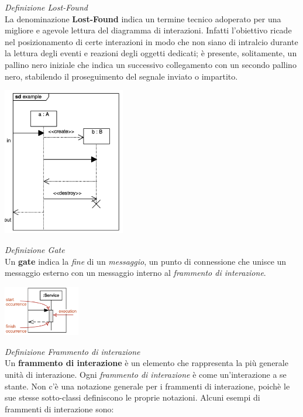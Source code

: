 \documentclass{article}
\begin{document}
\textit{Definizione Lost-Found}\\
La denominazione \textbf{Lost-Found} indica un termine tecnico adoperato per una migliore e agevole lettura del diagramma di interazioni. Infatti l'obiettivo ricade nel posizionamento di certe interazioni in modo che non siano di intralcio durante la lettura degli eventi e reazioni degli oggetti dedicati; è presente, solitamente, un pallino nero iniziale che indica un successivo collegamento con un secondo pallino nero, stabilendo il proseguimento del segnale inviato o impartito.\vspace*{14pt}
\begin{center}
    \includegraphics[width=0.4\textwidth]{foto 10.png}\\
\end{center}
\textit{Definizione Gate}\\
Un \textbf{gate} indica la \textit{fine} di un \textit{messaggio}, un punto di connessione che unisce un messaggio esterno con un messaggio interno al\textit{ frammento di interazione}.\vspace*{14pt}
\begin{center}
    \includegraphics[width=0.25\textwidth]{foto 11.png}\\
\end{center}
\textit{Definizione Frammento di interazione}\\
Un \textbf{frammento di interazione} è un elemento che rappresenta la più generale unità di interazione. Ogni \textit{frammento di interazione} è come un'interazione a se stante. Non c'è una notazione generale per i frammenti di interazione, poichè le sue stesse sotto-classi definiscono le proprie notazioni. Alcuni esempi di frammenti di interazione sono:
\end{document}
